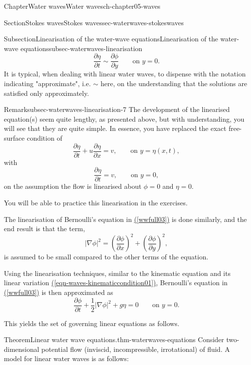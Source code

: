 \documentclass[oneside,10pt,]{book}
\newcommand{\xreffont}{\relax}
\numberwithin{equation}{section}
\newcommand{\pd}[2]{\frac{\partial#1}{\partial#2}}
\begin{document}
\begin{chapterptx}{Chapter}{Water waves}{}{Water waves}{}{}{ch-chapter05-waves}
\begin{sectionptx}{Section}{Stokes waves}{}{Stokes waves}{}{}{sec-waterwaves-stokeswaves}
\begin{subsectionptx}{Subsection}{Linearisation of the water-wave equations}{}{Linearisation of the water-wave equations}{}{}{subsec-waterwaves-linearisation}
\begin{equation}
\pd{\eta}{t} \sim \pd{\phi}{y} \qquad \text{on $y = 0$}.\label{eqn-waves-kinematiccondition01}
\end{equation}
It is typical, when dealing with linear water waves, to dispense with the notation indicating "approximate", i.e. \(\sim\) here, on the understanding that the solutions are satisfied only approximately.%
\begin{remark}{Remark}{}{subsec-waterwaves-linearisation-7}%
The development of the linearised equation(s) seem quite lengthy, as presented above, but with understanding, you will see that they are quite simple. In essence, you have replaced the exact free-surface condition of%
\begin{equation*}
\pd{\eta}{t} + u \pd{\eta}{x} = v, \qquad \text{on $y = \eta(x, t)$},
\end{equation*}
with%
\begin{equation*}
\pd{\eta}{t} = v, \qquad \text{on $y = 0$},
\end{equation*}
on the assumption the flow is linearised about \(\phi = 0\) and \(\eta = 0\).%
\end{remark}
You will be able to practice this linearisation in the exercises.%
\par
The linearisation of Bernoulli's equation in \hyperref[wwfull03]{({\xreffont\ref{wwfull03}})} is done similarly, and the end result is that the term,%
\begin{equation*}
|\nabla \phi|^2 = \left( \pd{\phi}{x}\right)^2  + \left( \pd{\phi}{y}\right)^2,
\end{equation*}
is assumed to be small compared to the other terms of the equation.%
\par
Using the linearisation techniques, similar to the kinematic equation and its linear variation \hyperref[eqn-waves-kinematiccondition01]{({\xreffont\ref{eqn-waves-kinematiccondition01}})}, Bernoulli's equation in \hyperref[wwfull03]{({\xreffont\ref{wwfull03}})} is then approximated as%
\begin{equation*}
\pd{\phi}{t} + \frac{1}{2} |\nabla \phi|^2 + g\eta  = 0 \qquad \text{on $y = 0$}.
\end{equation*}
%
\par
This yields the set of governing linear equations as follows.%
\begin{theorem}{Theorem}{Linear water wave equations.}{}{thm-waterwaves-equations}%
Consider two-dimensional potential flow (inviscid, incompressible, irrotational) of fluid. A model for linear water waves is as follows:%

\end{theorem}
\end{subsectionptx}
\end{sectionptx}
\end{chapterptx}
\end{document}
